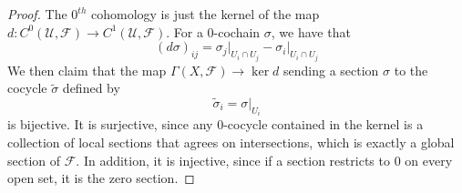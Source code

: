 %
\begin{proof}
The $0^{th}$ cohomology is just the kernel of the map
$d : C^0(\mathcal{U},\mathcal{F}) \to C^1(\mathcal{U}, \mathcal{F})$.
For a $0$-cochain $\sigma$, we have that
\[
(d\sigma)_{ij} = \sigma_j\vert_{U_i \cap U_j} - \sigma_i\vert_{U_i \cap U_j}
\]
We then claim that the map $\Gamma(X, \mathcal{F}) \to \ker d$ sending a section
$\sigma$ to the cocycle $\tilde{\sigma}$ defined by
\[
\tilde{\sigma}_i = \sigma\vert_{U_i}
\]
is bijective. It is surjective, since any $0$-cocycle contained in the kernel
is a collection of local sections that agrees on intersections, which is exactly
a global section of $\mathcal{F}$. In addition, it is injective, since if
a section restricts to $0$ on every open set, it is the zero section.
\end{proof}
